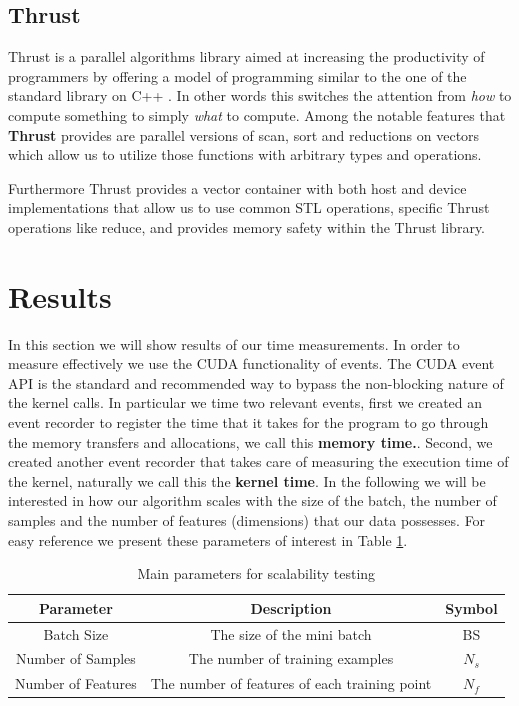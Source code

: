 \documentclass[11pt,a4paper]{article}
\begin{document}
\subsection{Thrust}
Thrust is a parallel algorithms library aimed at increasing the productivity of programmers by
offering a model of programming similar to the one of the standard library on C++
\citep{bell2012thrust}. In other words this switches the attention from \textit{how} to compute
something to simply \textit{what} to compute. Among the notable features that
\textbf{Thrust} provides are parallel versions of scan, sort and reductions on vectors which allow us
to utilize those functions with arbitrary types and operations.

Furthermore Thrust provides a vector container with both host and device implementations that allow us
to use common STL operations, specific Thrust operations like reduce, and provides memory safety
within the Thrust library.


\section{Results}

In this section we will show results of our time measurements. In order to measure effectively we
use the CUDA functionality of events. The CUDA event API is the standard and recommended way to 
bypass the non-blocking  nature of the kernel calls. 
In particular we time two relevant events, first we created an event recorder to 
register the time that it takes for the program to go through the memory transfers 
and allocations, we call this \textbf{memory time.}. Second, we created another event
recorder that takes care of measuring the execution time of the kernel, naturally we 
call this the \textbf{kernel time}. In the following we will be interested in how our 
algorithm scales with the size of the batch, the number of samples and the number 
of features (dimensions) that our data possesses. For easy 
reference we present these parameters of interest in Table \ref{table:parameters}.


\begin{table}[H]
\centering
\begin{tabular}{|c|c|c|}
\hline
Parameter & Description & Symbol\\
\hline
Batch Size & The size of the mini batch & BS \\
\hline
Number of Samples & The number of training examples & $N_s$ \\
\hline
Number of Features & The number of features of each training point & $N_f$ \\
\hline
\end{tabular}
\caption{Main parameters for scalability testing}
\label{table:parameters}
\end{table}
\end{document}
